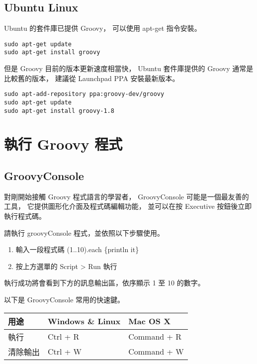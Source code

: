 \documentclass[a4paper,12pt,english]{sphinxmanual}
\begin{document}
\subsection{Ubuntu Linux}
\label{intro:ubuntu-linux}
Ubuntu 的套件庫已提供 Groovy，
可以使用 apt-get 指令安裝。

\begin{Verbatim}[commandchars=@\[\]]
sudo apt-get update
sudo apt-get install groovy
\end{Verbatim}

但是 Groovy 目前的版本更新速度相當快，
Ubuntu 套件庫提供的 Groovy 通常是比較舊的版本，
建議從 Launchpad PPA 安裝最新版本。

\begin{Verbatim}[commandchars=@\[\]]
sudo apt-add-repository ppa:groovy-dev/groovy
sudo apt-get update
sudo apt-get install groovy-1.8
\end{Verbatim}


\section{執行 Groovy 程式}
\label{intro:id3}

\subsection{GroovyConsole}
\label{intro:groovyconsole}
對剛開始接觸 Groovy 程式語言的學習者，
GroovyConsole 可能是一個最友善的工具，
它提供圖形化介面及程式碼編輯功能，
並可以在按 Executive 按鈕後立即執行程式碼。

請執行 groovyConsole 程式，並依照以下步驟使用。
\begin{enumerate}
\item {} 
輸入一段程式碼
(1..10).each \{println it\}

\item {} 
按上方選單的 Script \textgreater{} Run 執行

\end{enumerate}

執行成功將會看到下方的訊息輸出區，依序顯示 1 至 10 的數字。

以下是 GroovyConsole 常用的快速鍵。

\begin{tabulary}{\linewidth}{|L|L|L|}
\hline
\textbf{
用途
} & \textbf{
Windows \& Linux
} & \textbf{
Mac OS X
}\\
\hline

執行
 & 
Ctrl + R
 & 
Command + R
\\

清除輸出
 & 
Ctrl + W
 & 
Command + W
\\
\hline
\end{tabulary}
\end{document}
